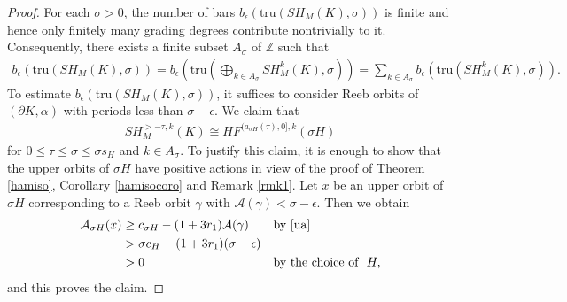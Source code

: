 \documentclass[12pt]{amsart}
\theoremstyle{definition}
\newcommand{\ZZ}{{\mathbb Z}}
\begin{document}
\begin{proof}
For each $\sigma>0$, the number of bars $b_{\epsilon} \left( \textrm{tru}(SH_M(K),\sigma ) \right)$ is finite and hence only finitely many grading degrees contribute nontrivially to it. Consequently, there exists a finite subset $A_\sigma$ of $\ZZ$ such that
\begin{align*}
    b_{\epsilon} \left( \textrm{tru}(SH_M(K),\sigma ) \right) = b_{\epsilon} \left( \textrm{tru}\left(\bigoplus_{k \in A_\sigma}SH^k_M(K),\sigma \right) \right) = \sum_{k \in A_\sigma}b_{\epsilon} \left( \textrm{tru}(SH^k_M(K),\sigma ) \right).
\end{align*}
To estimate $b_{\epsilon} \left( \textrm{tru}(SH_M(K),\sigma ) \right)$, it suffices to consider Reeb orbits of $(\partial K,\alpha)$ with periods less than $\sigma - \epsilon$. We claim that
\begin{align}\label{ingiso}
     SH^{>-\tau,k}_M(K) \cong  HF^{(a_{\sigma H}(\tau),0],k}(\sigma H)
\end{align}
for $0\leq \tau\leq\sigma \leq \sigma s_H$ and $k \in A_\sigma$. To justify this claim, it is enough to show that the upper orbits of $\sigma H$ have positive actions in view of the proof of Theorem \ref{hamiso}, Corollary \ref{hamisocoro} and Remark \ref{rmk1}. Let $x$ be an upper orbit of $\sigma H$ corresponding to a Reeb orbit $\gamma$ with $\mathcal{A}(\gamma) < \sigma - \epsilon$. Then we obtain
\begin{align*}
   \mathcal{A}_{\sigma H}(x) &\geq c_{\sigma H} - (1+3r_1)\mathcal{A}(\gamma) &&\textrm{by \eqref{ua}}\\&> \sigma c_H- (1+3r_1)(\sigma -\epsilon)\\&>0 &&\textrm{by the choice of }\,\,H,
\end{align*}
and this proves the claim.

\vspace{0.2cm}


\end{proof}
\end{document}
